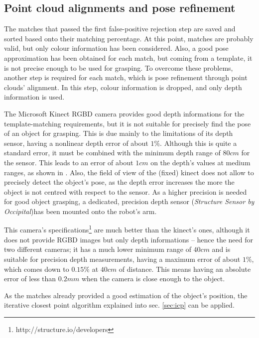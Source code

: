 \subsection{Point cloud alignments and pose refinement}
The matches that passed the first false-positive rejection step are saved and
sorted based onto their matching percentage. At this point, matches are probably
valid, but only colour information has been considered. Also, a good pose
approximation has been obtained for each match, but coming from a template, it
is not precise enough to be used for grasping. To overcome these problems,
another step is required for each match, which is pose refinement through point
clouds' alignment. In this step, colour information is dropped, and only depth
information is used. 

The Microsoft Kinect RGBD camera provides good depth informations for the template-matching
requirements, but it is not suitable for precisely find the pose of an object
for grasping. This is due mainly to the limitations of its depth sensor, having
a nonlinear depth error of about $1\%$.
Although this is quite a standard error, it must be combined with the minimum
depth range of $80\unit{cm}$ for the sensor. This leads to an error of about
$1\unit{cm}$ on the depth's values at medium ranges, as shown in \cite{kinect-evaluation}. Also, the field of view of the (fixed)
kinect does not allow to precisely detect the object's pose, as the depth error
increases the more the object is not centred with respect to the sensor. As a
higher precision is needed for good 
object grasping, a dedicated, precision depth sensor (\emph{Structure Sensor by
Occipital})has been mounted onto the robot's arm.


This camera's specifications\footnote{http://structure.io/developers} are much better than the kinect's ones, although it
does not provide RGBD images but only depth informations -- hence the need for two
different cameras; it has a much lower minimum range of $40\unit{cm}$ and is suitable for
precision depth measurements, having a maximum error of about $1\%$, which comes
down to $0.15\%$ at $40\unit{cm}$ of distance. This means having an absolute
error of less than $0.2\unit{mm}$ when the camera is close enough to the object.

As the matches already provided a good estimation of the object's position, the
iterative closest point algorithm explained into sec. \ref{sec:icp} can be
applied. 


